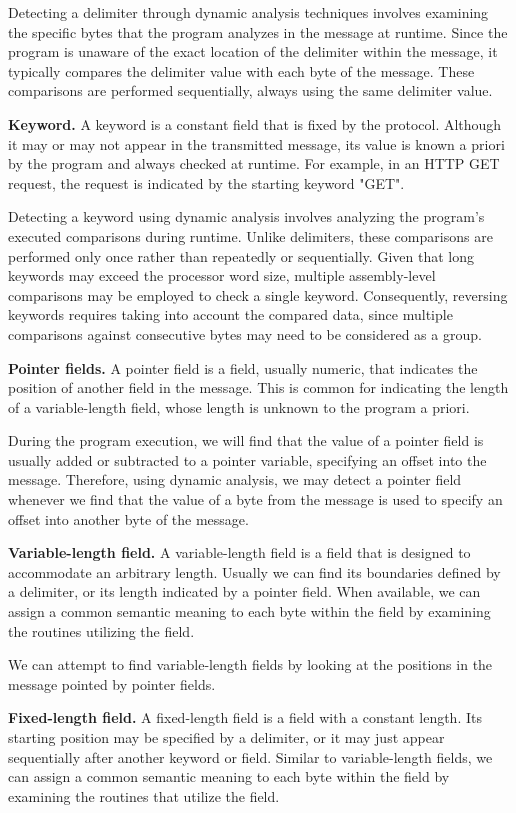 \documentclass[conference]{IEEEtran}
\begin{document}
Detecting a delimiter through dynamic analysis techniques involves examining
the specific bytes that the program analyzes in the message at runtime. Since
the program is unaware of the exact location of the delimiter within the
message, it typically compares the delimiter value with each byte of the
message. These comparisons are performed sequentially, always using the same
delimiter value.

\textbf{Keyword.} A keyword is a constant field that is fixed by the protocol.
Although it may or may not appear in the transmitted message,
its value is known a priori by the program and always checked at runtime.
For example, in an HTTP GET request, the request is indicated by the starting keyword "GET".

Detecting a keyword using dynamic analysis involves analyzing the program's
executed comparisons during runtime. Unlike delimiters, these comparisons are
performed only once rather than repeatedly or sequentially. Given that long
keywords may exceed the processor word size, multiple assembly-level
comparisons may be employed to check a single keyword. Consequently, reversing
keywords requires taking into account the compared data, since multiple
comparisons against consecutive bytes may need to be considered as a group.

\textbf{Pointer fields.} A pointer field is a field, usually numeric, that indicates the
position of another field in the message. This is common for indicating the length of a variable-length
field, whose length is unknown to the program a priori.

During the program execution, we will find that the value of a pointer field is
usually added or subtracted to a pointer variable, specifying an offset into
the message. Therefore, using dynamic analysis, we may detect a pointer field
whenever we find that the value of a byte from the message is used to specify
an offset into another byte of the message.

\textbf{Variable-length field.} A variable-length field is a field that is designed
to accommodate an arbitrary length. Usually we can find its boundaries defined by
a delimiter, or its length indicated by a pointer field.
When available, we can assign a common semantic meaning to each byte within the field by
examining the routines utilizing the field.

We can attempt to find variable-length fields by looking at the positions in
the message pointed by pointer fields.

\textbf{Fixed-length field.} A fixed-length field is a field with a constant length. Its starting
position may be specified by a delimiter, or it may just appear sequentially after another keyword
or field.
Similar to variable-length fields, we can assign a common semantic meaning to each byte within the field by
examining the routines that utilize the field.
\end{document}
